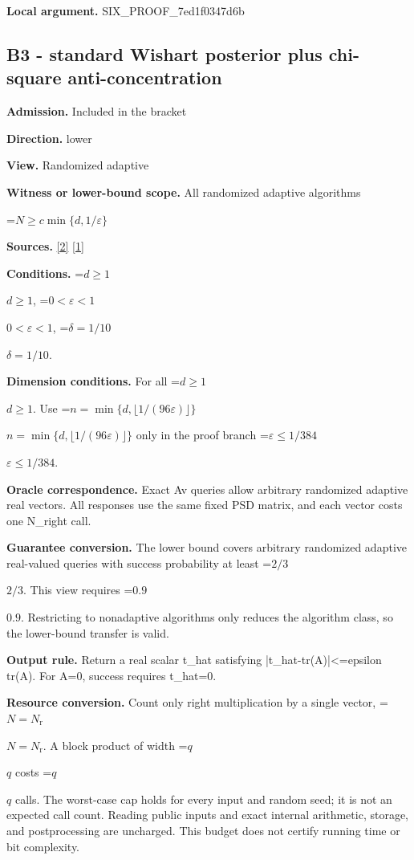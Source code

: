 \documentclass[10pt,a4paper]{article}
\newcommand{\AtlasMath}[1]{\par\begingroup\centering\setbox0=\hbox{$\displaystyle #1$}\ifdim\wd0>1.4\linewidth\typeout{ATLAS WIDE FORMULA: \the\wd0}\fi\ifdim\wd0>\linewidth\resizebox{\linewidth}{!}{\box0}\else\box0\fi\par\endgroup}
\newcommand{\AtlasInlineMath}[1]{\begingroup\setbox0=\hbox{$#1$}\ifdim\wd0>.4\linewidth\endgroup\AtlasMath{#1}\else\endgroup$#1$\fi}
\begin{document}
\textbf{Local argument.} SIX\_\allowbreak{}PROOF\_\allowbreak{}7ed1f0347d6b

\subsection{B3 - standard Wishart posterior plus chi-square anti-concentration}
\textbf{Admission.} Included in the bracket

\textbf{Direction.} lower

\textbf{View.} Randomized adaptive

\textbf{Witness or lower-bound scope.} All randomized adaptive algorithms

\AtlasMath{N\ge c\min\{d,1/\varepsilon\}}
\textbf{Sources.} \href{https://arxiv.org/pdf/2402.09379v3}{[2]} \href{https://proceedings.mlr.press/v125/braverman20a/braverman20a.pdf}{[1]}

\textbf{Conditions.} \AtlasInlineMath{d\ge1}, \AtlasInlineMath{0<\varepsilon<1}, \AtlasInlineMath{\delta=1/10}.

\textbf{Dimension conditions.} For all \AtlasInlineMath{d\ge1}. Use \AtlasInlineMath{n=\min\{d,\lfloor1/(96\varepsilon)\rfloor\}} only in the proof branch \AtlasInlineMath{\varepsilon\le1/384}.

\textbf{Oracle correspondence.} Exact Av queries allow arbitrary randomized adaptive real vectors. All responses use the same fixed PSD matrix, and each vector costs one N\_\allowbreak{}right call.

\textbf{Guarantee conversion.} The lower bound covers arbitrary randomized adaptive real-valued queries with success probability at least \AtlasInlineMath{2/3}. This view requires \AtlasInlineMath{0.9}. Restricting to nonadaptive algorithms only reduces the algorithm class, so the lower-bound transfer is valid.

\textbf{Output rule.} Return a real scalar t\_\allowbreak{}hat satisfying |t\_\allowbreak{}hat-tr(A)|<=epsilon tr(A). For A=0, success requires t\_\allowbreak{}hat=0.

\textbf{Resource conversion.} Count only right multiplication by a single vector, \AtlasInlineMath{N=N_{\mathrm r}}. A block product of width \AtlasInlineMath{q} costs \AtlasInlineMath{q} calls. The worst-case cap holds for every input and random seed; it is not an expected call count. Reading public inputs and exact internal arithmetic, storage, and postprocessing are uncharged. This budget does not certify running time or bit complexity.
\end{document}
